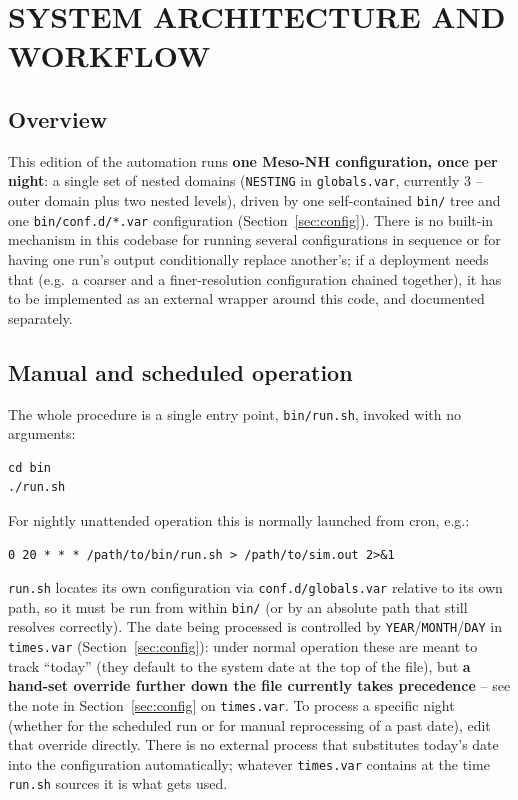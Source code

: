 \section{SYSTEM ARCHITECTURE AND WORKFLOW}
\label{sec:usage}

\subsection{Overview}
This edition of the automation runs \textbf{one Meso-NH configuration, once per night}: a single set of
nested domains (\texttt{NESTING} in \texttt{globals.var}, currently 3 -- outer domain plus two nested
levels), driven by one self-contained \texttt{bin/} tree and one \texttt{bin/conf.d/*.var} configuration
(Section~\ref{sec:config}). There is no built-in mechanism in this codebase for running several
configurations in sequence or for having one run's output conditionally replace another's; if a
deployment needs that (e.g.\ a coarser and a finer-resolution configuration chained together), it has to
be implemented as an external wrapper around this code, and documented separately.

\subsection{Manual and scheduled operation}
The whole procedure is a single entry point, \texttt{bin/run.sh}, invoked with no arguments:
\begin{lstlisting}
cd bin
./run.sh
\end{lstlisting}
For nightly unattended operation this is normally launched from cron, e.g.:
\begin{lstlisting}
0 20 * * * /path/to/bin/run.sh > /path/to/sim.out 2>&1
\end{lstlisting}
\texttt{run.sh} locates its own configuration via \texttt{conf.d/globals.var} relative to its own path,
so it must be run from within \texttt{bin/} (or by an absolute path that still resolves correctly). The
date being processed is controlled by \texttt{YEAR}/\texttt{MONTH}/\texttt{DAY} in \texttt{times.var}
(Section~\ref{sec:config}): under normal operation these are meant to track ``today'' (they default to
the system date at the top of the file), but \textbf{a hand-set override further down the file
currently takes precedence} -- see the note in Section~\ref{sec:config} on \texttt{times.var}. To
process a specific night (whether for the scheduled run or for manual reprocessing of a past date), edit
that override directly. There is no external process that substitutes today's date into the
configuration automatically; whatever \texttt{times.var} contains at the time \texttt{run.sh} sources it
is what gets used.


